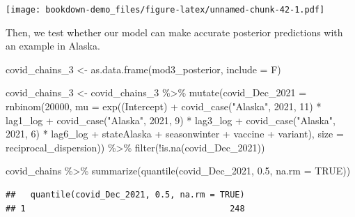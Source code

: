 \documentclass[
]{book}
\newenvironment{Shaded}{\begin{snugshade}}{\end{snugshade}}
\newcommand{\AttributeTok}[1]{\textcolor[rgb]{0.77,0.63,0.00}{#1}}
\newcommand{\ConstantTok}[1]{\textcolor[rgb]{0.00,0.00,0.00}{#1}}
\newcommand{\DecValTok}[1]{\textcolor[rgb]{0.00,0.00,0.81}{#1}}
\newcommand{\FloatTok}[1]{\textcolor[rgb]{0.00,0.00,0.81}{#1}}
\newcommand{\FunctionTok}[1]{\textcolor[rgb]{0.00,0.00,0.00}{#1}}
\newcommand{\NormalTok}[1]{#1}
\newcommand{\OtherTok}[1]{\textcolor[rgb]{0.56,0.35,0.01}{#1}}
\newcommand{\SpecialCharTok}[1]{\textcolor[rgb]{0.00,0.00,0.00}{#1}}
\newcommand{\StringTok}[1]{\textcolor[rgb]{0.31,0.60,0.02}{#1}}
\begin{document}
\texttt{[image: bookdown-demo\_files/figure-latex/unnamed-chunk-42-1.pdf]}

Then, we test whether our model can make accurate posterior predictions with an example in Alaska.

\begin{Shaded}
\begin{Highlighting}[]
\NormalTok{covid\_chains\_3 }\OtherTok{\textless{}{-}} \FunctionTok{as.data.frame}\NormalTok{(mod3\_posterior, }\AttributeTok{include =}\NormalTok{ F)}

\NormalTok{covid\_chains\_3 }\OtherTok{\textless{}{-}}\NormalTok{ covid\_chains\_3 }\SpecialCharTok{\%\textgreater{}\%}
  \FunctionTok{mutate}\NormalTok{(}\AttributeTok{covid\_Dec\_2021 =} \FunctionTok{rnbinom}\NormalTok{(}\DecValTok{20000}\NormalTok{, }\AttributeTok{mu =} \FunctionTok{exp}\NormalTok{(}\StringTok{\textasciigrave{}}\AttributeTok{(Intercept)}\StringTok{\textasciigrave{}} \SpecialCharTok{+} \FunctionTok{covid\_case}\NormalTok{(}\StringTok{"Alaska"}\NormalTok{, }\DecValTok{2021}\NormalTok{, }\DecValTok{11}\NormalTok{) }\SpecialCharTok{*}\NormalTok{ lag1\_log }\SpecialCharTok{+} \FunctionTok{covid\_case}\NormalTok{(}\StringTok{"Alaska"}\NormalTok{, }\DecValTok{2021}\NormalTok{, }\DecValTok{9}\NormalTok{) }\SpecialCharTok{*}\NormalTok{ lag3\_log }\SpecialCharTok{+} \FunctionTok{covid\_case}\NormalTok{(}\StringTok{"Alaska"}\NormalTok{, }\DecValTok{2021}\NormalTok{, }\DecValTok{6}\NormalTok{) }\SpecialCharTok{*}\NormalTok{ lag6\_log }\SpecialCharTok{+}\NormalTok{ stateAlaska }\SpecialCharTok{+}\NormalTok{ seasonwinter }\SpecialCharTok{+}\NormalTok{ vaccine }\SpecialCharTok{+}\NormalTok{ variant), }\AttributeTok{size =}\NormalTok{ reciprocal\_dispersion)) }\SpecialCharTok{\%\textgreater{}\%}
  \FunctionTok{filter}\NormalTok{(}\SpecialCharTok{!}\FunctionTok{is.na}\NormalTok{(covid\_Dec\_2021)) }

\NormalTok{covid\_chains }\SpecialCharTok{\%\textgreater{}\%}
  \FunctionTok{summarize}\NormalTok{(}\FunctionTok{quantile}\NormalTok{(covid\_Dec\_2021, }\FloatTok{0.5}\NormalTok{, }\AttributeTok{na.rm =} \ConstantTok{TRUE}\NormalTok{))}
\end{Highlighting}
\end{Shaded}

\begin{verbatim}
##   quantile(covid_Dec_2021, 0.5, na.rm = TRUE)
## 1                                         248
\end{verbatim}
\end{document}
